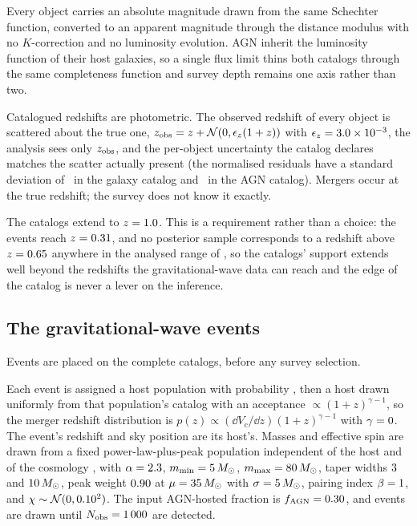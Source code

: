 Every object carries an absolute magnitude drawn from the same Schechter
function, converted to an apparent magnitude through the distance modulus with
no $K$-correction and no luminosity evolution. AGN inherit the luminosity
function of their host galaxies, so a single flux limit thins both catalogs
through the same completeness function and survey depth remains one axis rather
than two.

Catalogued redshifts are photometric. The observed redshift of every object is
scattered about the true one, $z_{\rm obs} = z + \mathcal{N}(0,
\epsilon_z(1+z))$ with $\epsilon_z = 3.0\times10^{-3}$, the analysis sees only
$z_{\rm obs}$, and the per-object uncertainty the catalog declares matches the
scatter actually present (the normalised residuals have a standard deviation
of \CatPhotozPullSd\ in the galaxy catalog and \CatPhotozPullSdAgn\ in the AGN
catalog). Mergers occur at the true redshift; the survey does not know it
exactly.

The catalogs extend to $z = 1.0$. This is a requirement rather than a
choice: the events reach $z = 0.31$, and no posterior sample corresponds
to a redshift above $z = 0.65$ anywhere in the analysed range of \Hz, so the
catalogs' support extends well beyond the redshifts the gravitational-wave data
can reach and the edge of the catalog is never a lever on the inference.

\subsection{The gravitational-wave events}
\label{sec:data:events}

Events are placed on the complete catalogs, before any survey selection.

Each event is assigned a host population with probability \fagn, then a host
drawn uniformly from that population's catalog with an acceptance
$\propto (1+z)^{\gamma-1}$, so the merger redshift distribution is
$p(z) \propto (\dd V_c/\dd z)(1+z)^{\gamma-1}$ with $\gamma = 0$. The
event's redshift and sky position are its host's. Masses and effective spin are
drawn from a fixed power-law-plus-peak population independent of the host and
of the cosmology \citep{GWTC3Pop2023}, with $\alpha = 2.3$,
$m_{\min} = 5\,M_\odot$, $m_{\max} = 80\,M_\odot$, taper widths
$3$ and $10\,M_\odot$, peak weight $0.90$ at
$\mu = 35\,M_\odot$ with $\sigma = 5\,M_\odot$, pairing index
$\beta = 1$, and $\chi \sim \mathcal{N}(0, 0.10^2)$. The input
AGN-hosted fraction is $f_{\rm AGN} = 0.30$, and events are drawn until
$N_{\rm obs} = 1\,000$ are detected.

